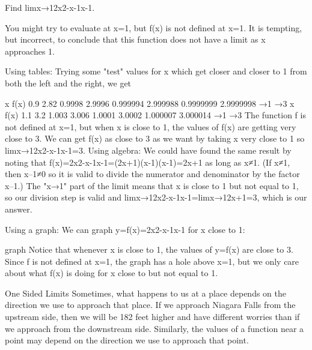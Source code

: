 \begin{example}
Find limx→12x2-x-1x-1.

\begin{solution} You might try to evaluate at x=1, but f(x) is not defined at x=1. It is tempting, but incorrect, to conclude that this function does not have a limit as x approaches 1.

Using tables: Trying some "test" values for x which get closer and closer to 1 from both the left and the right, we get

x	f(x)	0.9	2.82	0.9998	2.9996	0.999994	2.999988	0.9999999	2.9999998	→1	→3 x	f(x)	1.1	3.2	1.003	3.006	1.0001	3.0002	1.000007	3.000014	→1	→3
The function f is not defined at x=1, but when x is close to 1, the values of f(x) are getting very close to 3. We can get f(x) as close to 3 as we want by taking x very close to 1 so
limx→12x2-x-1x-1=3.
Using algebra: We could have found the same result by noting that
f(x)=2x2-x-1x-1=(2x+1)(x-1)(x-1)=2x+1
as long as x≠1. (If x≠1, then x–1≠0 so it is valid to divide the numerator and denominator by the factor x–1.) The "x→1" part of the limit means that x is close to 1 but not equal to 1, so our division step is valid and
limx→12x2-x-1x-1=limx→12x+1=3,
which is our answer.

Using a graph: We can graph y=f(x)=2x2-x-1x-1 for x close to 1:

graph
Notice that whenever x is close to 1, the values of y=f(x) are close to 3. Since f is not defined at x=1, the graph has a hole above x=1, but we only care about what f(x) is doing for x close to but not equal to 1.
\end{solution}\end{example}
One Sided Limits
Sometimes, what happens to us at a place depends on the direction we use to approach that place. If we approach Niagara Falls from the upstream side, then we will be 182 feet higher and have different worries than if we approach from the downstream side. Similarly, the values of a function near a point may depend on the direction we use to approach that point.

